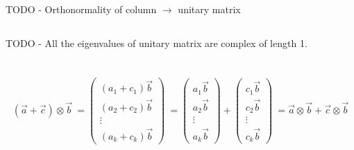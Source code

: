 \documentclass[a4paper,10pt]{hw}
\begin{document}
\subsection{}

TODO - Orthonormality of column $\to$ unitary matrix

\subsection{}

TODO - All the eigenvalues of unitary matrix are complex of length 1.

\section{}

\subsection{}

\subsubsection{}
$$
(\vec{a} + \vec{c}) \otimes \vec{b}
\
=
\begin{pmatrix} 
(a_1 + c_1) \vec{b} \\ (a_2 + c_2) \vec{b} \\ \vdots \\ (a_k + c_k) \vec{b} 
\end{pmatrix}
\
=
\begin{pmatrix} 
a_1 \vec{b} \\ a_2 \vec{b} \\ \vdots \\ a_k \vec{b} 
\end{pmatrix}
+
\begin{pmatrix} 
c_1 \vec{b} \\ c_2 \vec{b} \\ \vdots \\ c_k \vec{b} 
\end{pmatrix}
\
=
\vec{a}\otimes\vec{b} + \vec{c}\otimes\vec{b}
$$
\end{document}
